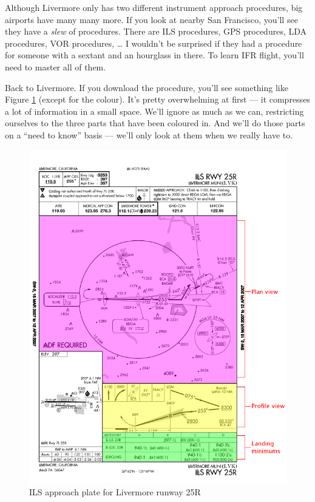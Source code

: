 Although Livermore only has two different instrument approach
procedures, big airports have many many more.  If you look at nearby
San Francisco, you'll see they have a \emph{slew} of procedures.
There are ILS procedures, GPS procedures, LDA procedures, VOR
procedures, \ldots{} I wouldn't be surprised if they had a procedure
for someone with a sextant and an hourglass in there.  To learn IFR
flight, you'll need to master all of them.

Back to Livermore.  If you download the procedure, you'll see
something like Figure \ref{fig:big_plate} (except for the colour).
It's pretty overwhelming at first --- it compresses a lot of
information in a small space.  We'll ignore as much as we can,
restricting ourselves to the three parts that have been coloured in.
And we'll do those parts on a ``need to know'' basis --- we'll only
look at them when we really have to.

\begin{figure}
  \begin{center}
    \includegraphics[width=14cm]{img/big_plate}
    \caption{ILS approach plate for Livermore runway 25R}
    \label{fig:big_plate}
  \end{center}
\end{figure}

